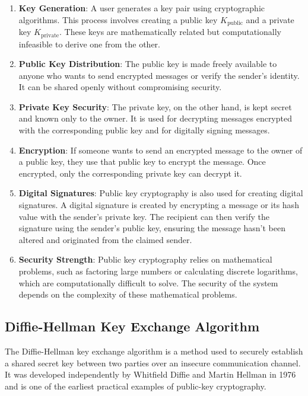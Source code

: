 \documentclass[11pt]{article}
\begin{document}
\begin{enumerate}
    \item \textbf{Key Generation}: A user generates a key pair using cryptographic algorithms. This process involves creating a public key $K_{\text{public}}$ and a private key $K_{\text{private}}$. These keys are mathematically related but computationally infeasible to derive one from the other.
    
    \item \textbf{Public Key Distribution}: The public key is made freely available to anyone who wants to send encrypted messages or verify the sender's identity. It can be shared openly without compromising security.
    
    \item \textbf{Private Key Security}: The private key, on the other hand, is kept secret and known only to the owner. It is used for decrypting messages encrypted with the corresponding public key and for digitally signing messages.
    
    \item \textbf{Encryption}: If someone wants to send an encrypted message to the owner of a public key, they use that public key to encrypt the message. Once encrypted, only the corresponding private key can decrypt it.
    
    \item \textbf{Digital Signatures}: Public key cryptography is also used for creating digital signatures. A digital signature is created by encrypting a message or its hash value with the sender's private key. The recipient can then verify the signature using the sender's public key, ensuring the message hasn't been altered and originated from the claimed sender.
    
    \item \textbf{Security Strength}: Public key cryptography relies on mathematical problems, such as factoring large numbers or calculating discrete logarithms, which are computationally difficult to solve. The security of the system depends on the complexity of these mathematical problems.
\end{enumerate}

\subsection{Diffie-Hellman Key Exchange Algorithm}

The Diffie-Hellman key exchange algorithm is a method used to securely establish a shared secret key between two parties over an insecure communication channel. It was developed independently by Whitfield Diffie and Martin Hellman in 1976 and is one of the earliest practical examples of public-key cryptography.
\end{document}
